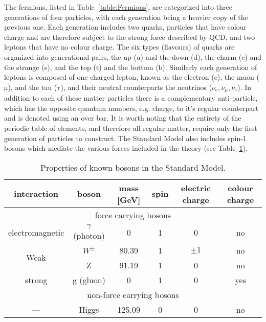 The fermions, listed in Table~\ref{table:Fermions}, are categorized into three generations of four particles, with each generation being a heavier copy of the previous one.  
Each generation includes two quarks, particles that have colour charge and are therefore subject to the strong force described by \gls{QCD}, and two leptons that have no colour charge.  
The six types (flavours) of quarks are organized into generational pairs, the up (u) and the down (d), the charm (c) and the strange (s), and the top (t) and the bottom (b).  
Similarly each generation of leptons is composed of one charged lepton, known as the electron (e), the muon ($\mathrm{\mu}$), and the tau ($\mathrm{\tau}$), and their neutral counterparts the neutrinos ($\nu_{\mathrm{e}}, \nu_{\mu}, \nu_{\tau}$).  
In addition to each of these matter particles there is a complementary anti-particle, which has the opposite quantum numbers, e.g. charge, to it's regular counterpart and is denoted using an over bar.  
It is worth noting that the entirety of the periodic table of elements, and therefore all regular matter, require only the first generation of particles to construct.  
The Standard Model also includes spin-1 bosons which mediate the various forces included in the theory (see Table~\ref{table:Bosons}). 

\begin{table}
  \centering
  \begin{tabular}{ |c|c|c|c|c|c|}
  \hline
  interaction     & boson             & mass [GeV] & spin & electric charge &  colour charge \\ \hline
  \multicolumn{6}{|c|}{force carrying bosons} \\ \hline
  electromagnetic & $\gamma$ (photon) & 0          & 1 & 0 & no \\ \hline
  \multirow{2}{*}{Weak} & $W^{\pm}$ & 80.39 & 1 & $\pm1$ & no  \\ 
                        & Z & 91.19 & 1 & 0 & no \\ \hline
  strong & g (gluon) & 0 & 1 & 0 & yes \\ \hline 
  \multicolumn{6}{|c|}{non-force carrying bosons} \\ \hline
  --- & Higgs & 125.09 & 0 & 0 & no \\ \hline
  \end{tabular}
  \caption[Properties of known bosons in the Standard Model.]
        {\small Properties of known bosons in the Standard Model.}
\label{table:Bosons}
\end{table}



